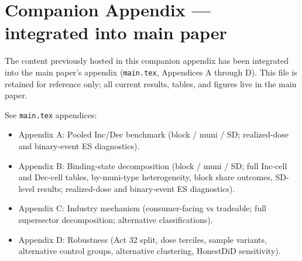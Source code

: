 \documentclass[12pt]{article}
\begin{document}
\section*{Companion Appendix --- integrated into main paper}

The content previously hosted in this companion appendix has been
integrated into the main paper's appendix (\texttt{main.tex},
Appendices A through D). This file is retained for reference only;
all current results, tables, and figures live in the main paper.

\medskip
\noindent See \texttt{main.tex} appendices:
\begin{itemize}
  \item Appendix A: Pooled Inc/Dec benchmark (block / muni / SD;
        realized-dose and binary-event ES diagnostics).
  \item Appendix B: Binding-state decomposition (block / muni / SD;
        full Inc-cell and Dec-cell tables, by-muni-type heterogeneity,
        block share outcomes, SD-level results; realized-dose and
        binary-event ES diagnostics).
  \item Appendix C: Industry mechanism (consumer-facing vs tradeable;
        full supersector decomposition; alternative classifications).
  \item Appendix D: Robustness (Act 32 split, dose terciles, sample
        variants, alternative control groups, alternative clustering,
        HonestDiD sensitivity).
\end{itemize}
\end{document}
